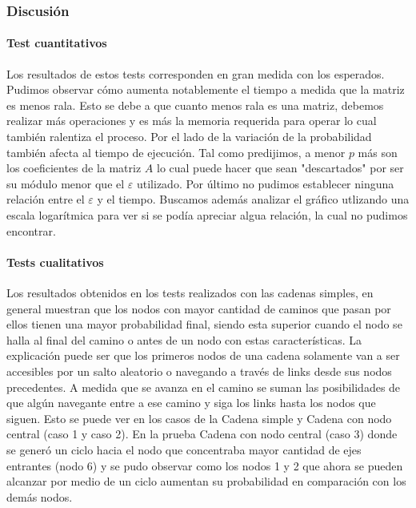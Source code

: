 \subsubsection*{Discusión}
\paragraph{Test cuantitativos}
Los resultados de estos tests corresponden en gran medida con los esperados. Pudimos observar c\'omo aumenta notablemente el tiempo
a medida que la matriz es menos rala. Esto se debe a que cuanto menos rala es una matriz, debemos realizar m\'as operaciones y es m\'as la
memoria requerida para operar lo cual también ralentiza el proceso.\newline
Por el lado de la variaci\'on de la probabilidad también afecta al tiempo de ejecuci\'on. Tal como predijimos, a menor $p$ m\'as son
los coeficientes de la matriz $A$ lo cual puede hacer que sean "descartados" por ser su m\'odulo menor que el $\varepsilon$ utilizado.\newline
Por \'ultimo no pudimos establecer ninguna relaci\'on entre el $\varepsilon$ y el tiempo. Buscamos además
analizar el gr\'afico utlizando una escala logar\'itmica para ver si se pod\'ia apreciar algua relaci\'on, la cual no pudimos encontrar.
\paragraph{Tests cualitativos}
Los resultados obtenidos en los tests realizados con las cadenas simples, en general muestran que los nodos con mayor cantidad de caminos que pasan por ellos tienen una mayor probabilidad final, siendo esta superior cuando el nodo se halla al final del camino o antes de un nodo con estas características. La explicación puede ser que los primeros nodos de una cadena solamente van a ser accesibles por un salto aleatorio o navegando a través de links desde sus nodos precedentes. A medida que se avanza en el camino se suman las posibilidades de que algún navegante entre a ese camino y siga los links hasta los nodos que siguen. Esto se puede ver en los casos de la Cadena simple y Cadena con nodo central (caso 1 y caso 2). En la prueba Cadena con nodo central (caso 3) donde se generó un ciclo hacia el nodo que concentraba mayor cantidad de ejes entrantes (nodo 6) y se pudo observar como los nodos 1 y 2 que ahora se pueden alcanzar por medio de un ciclo aumentan su probabilidad en comparación con los demás nodos.

